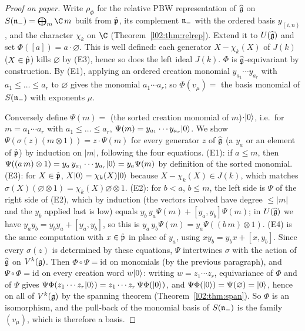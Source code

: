 \begin{proof}[Proof on paper]
Write $\rho_\Phi$ for the relative PBW representation of $\widehat{\mathfrak{g}}$ on $S(\ltwon_-) = \bigoplus_m\C\,m$ built from
$\hat{\mathfrak{p}}$, its complement $\mathfrak{n}_-$ with the ordered basis $y_{(i,n)}$, and the character $\chi_k$ on $\C$
(Theorem~\ref{l02:thm:relrep}). Extend it to $U(\widehat{\mathfrak{g}})$ and set $\Phi([a]) = a\cdot\varnothing$. This is
well defined: each generator $X - \chi_k(X)$ of $J(k)$ ($X\in\hat{\mathfrak{p}}$) kills $\varnothing$ by (E3), hence so
does the left ideal $J(k)$. $\Phi$ is $\widehat{\mathfrak{g}}$-equivariant by construction. By (E1), applying an ordered
creation monomial $y_{a_1}\cdots y_{a_r}$ with $a_1\le\dots\le a_r$ to $\varnothing$ gives the monomial
$a_1\cdots a_r$; so $\Phi(v_\mu) = $ the basis monomial of $S(\mathfrak{n}_-)$ with exponents $\mu$.

Conversely define $\Psi(m) = $ (the sorted creation monomial of $m$)$\cdot|0\rangle$, i.e.\ for
$m = a_1\cdots a_r$ with $a_1\le\dots\le a_r$, $\Psi(m) = y_{a_1}\cdots y_{a_r}|0\rangle$. We show
$\Psi(\sigma(z)(m\otimes1)) = z\cdot\Psi(m)$ for every generator $z$ of $\widehat{\mathfrak{g}}$ (a $y_a$ or an element of
$\hat{\mathfrak{p}}$) by induction on $|m|$, following the four equations. (E1): if $a\le m$, then
$\Psi((a\,m)\otimes1) = y_a\,y_{a_1}\cdots y_{a_r}|0\rangle = y_a\Psi(m)$ by definition of the sorted monomial. (E3): for
$X\in\hat{\mathfrak{p}}$, $X|0\rangle = \chi_k(X)|0\rangle$ because $X - \chi_k(X)\in J(k)$, which matches
$\sigma(X)(\varnothing\otimes1) = \chi_k(X)\varnothing\otimes1$. (E2): for $b<a$, $b\le m$, the left side is
$\Psi$ of the right side of (E2), which by induction (the vectors involved have degree $\le|m|$ and
the $y_b$ applied last is low) equals $y_b\,y_a\Psi(m) + [y_a,y_b]\Psi(m)$; in $U(\widehat{\mathfrak{g}})$ we have
$y_ay_b = y_by_a + [y_a,y_b]$, so this is $y_a\,y_b\Psi(m) = y_a\Psi((b\,m)\otimes1)$. (E4) is the same computation with
$x\in\hat{\mathfrak{p}}$ in place of $y_a$, using $xy_b = y_bx + [x,y_b]$. Since every $\sigma(z)$ is determined by these
equations, $\Psi$ intertwines $\sigma$ with the action of $\widehat{\mathfrak{g}}$ on $V^k(\mathfrak{g})$. Then
$\Phi\circ\Psi = \mathrm{id}$ on monomials (by the previous paragraph), and $\Psi\circ\Phi = \mathrm{id}$ on every
creation word $w|0\rangle$: writing $w = z_1\cdots z_r$, equivariance of $\Phi$ and of $\Psi$ gives
$\Psi\Phi(z_1\cdots z_r|0\rangle) = z_1\cdots z_r\,\Psi\Phi(|0\rangle)$, and $\Psi\Phi(|0\rangle) = \Psi(\varnothing) = |0\rangle$, hence on all of $V^k(\mathfrak{g})$ by the spanning theorem
 (Theorem~\ref{l02:thm:span}). So $\Phi$ is an isomorphism, and the pull-back of the
monomial basis of $S(\mathfrak{n}_-)$ is the family $(v_\mu)$, which is therefore a basis.
\end{proof}

